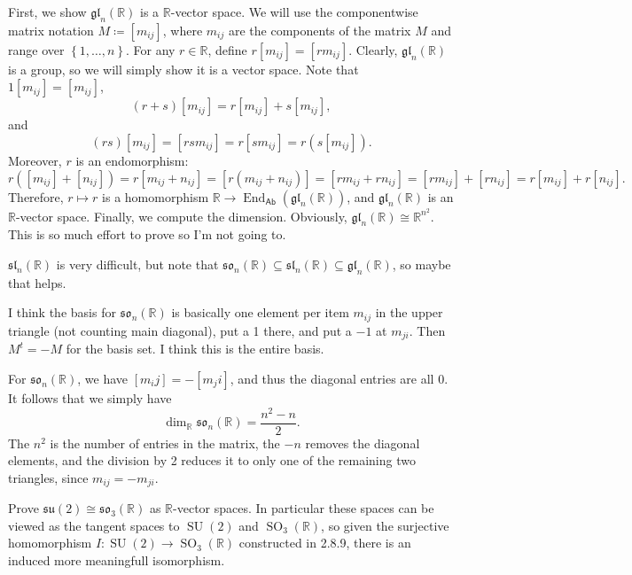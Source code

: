\documentclass[11pt]{report}
\DeclareMathOperator{\End}{End}
\begin{document}
\begin{solution}
	First, we show $\mathfrak{gl} _n(\mathbb{R} )$ is a $\mathbb{R} $-vector space. We will use the componentwise matrix notation $M\coloneqq [m_{ij} ]$, where $m_{ij} $ are the components of the matrix $M$ and range over $\left\{ 1, \ldots ,n \right\} $. For any $r\in\mathbb{R} $, define $r[m_{ij} ]=[r m_{ij} ] $. Clearly, $\mathfrak{gl} _n(\mathbb{R} )$ is a group, so we will simply show it is a vector space. Note that $1[m_{ij} ]=[m_{ij} ]$,
	\[
		(r+s)[m_{ij} ]=r[m_{ij} ]+s[m_{ij} ]
	,\]
	and
	\[
		(rs)[m_{ij} ]=[rsm_{ij} ]=r[sm_{ij} ]=r\left( s[m_{ij} ] \right)  
	.\]
	Moreover, $r$ is an endomorphism:
	\[
		r\left( [m_{ij} ]+[n_{ij} ] \right) =r[m_{ij} +n_{ij} ]=[r\left( m_{ij} +n_{ij}  \right) ]=[r m_{ij} +rn_{ij} ]=[r m_{ij} ]+[rn_{ij} ]=r[m_{ij} ]+r[n_{ij} ] 
	.\]
	Therefore, $r\mapsto r$ is a homomorphism $\mathbb{R}  \to \End_{\mathsf{Ab} }(\mathfrak{gl}_n(\mathbb{R} )) $, and $\mathfrak{gl} _n(\mathbb{R} )$ is an $\mathbb{R} $-vector space. Finally, we compute the dimension. Obviously, $\mathfrak{gl}_n(\mathbb{R} )\cong \mathbb{R} ^{n^2} $. This is so much effort to prove so I'm not going to.

	$\mathfrak{sl}_n(\mathbb{R} )$ is very difficult, but note that $\mathfrak{so}_n(\mathbb{R} )\subseteq \mathfrak{sl}_n(\mathbb{R} )\subseteq \mathfrak{gl}_n(\mathbb{R} )$,  so maybe that helps.

	I think the basis for $\mathfrak{so}_n(\mathbb{R} )$ is basically one element per item $m_{ij} $ in the upper triangle (not counting main diagonal), put a 1 there, and put a $-1$ at $m_{ji} $. Then $M^t=-M$ for the basis set. I think this is the entire basis.

	For $\mathfrak{so} _n(\mathbb{R} )$, we have $[m_ij]=-[m_ji]$, and thus the diagonal entries are all 0. It follows that we simply have
	\[
		\dim_{\mathbb{R} } \mathfrak{so}_n(\mathbb{R} )=\frac{n^2-n}{2} 
	.\]
	The $n^2$ is the number of entries in the matrix, the $-n$ removes the diagonal elements, and the division by 2 reduces it to only one of the remaining two triangles, since $m_{ij} =-m_{ji} $.
\end{solution}
\begin{exercise}
	Prove $\mathfrak{su}(2)\cong \mathfrak{so}_3(\mathbb{R} )$ as $\mathbb{R} $-vector spaces. In particular these spaces can be viewed as the tangent spaces to $\operatorname{SU} (2)$ and $\operatorname{SO}_3(\mathbb{R} )$, so given the surjective homomorphism $I : \operatorname{SU} (2) \to \operatorname{SO}_3(\mathbb{R} )$ constructed in 2.8.9, there is an induced more meaningfull isomorphism.
\end{exercise}
\end{document}
